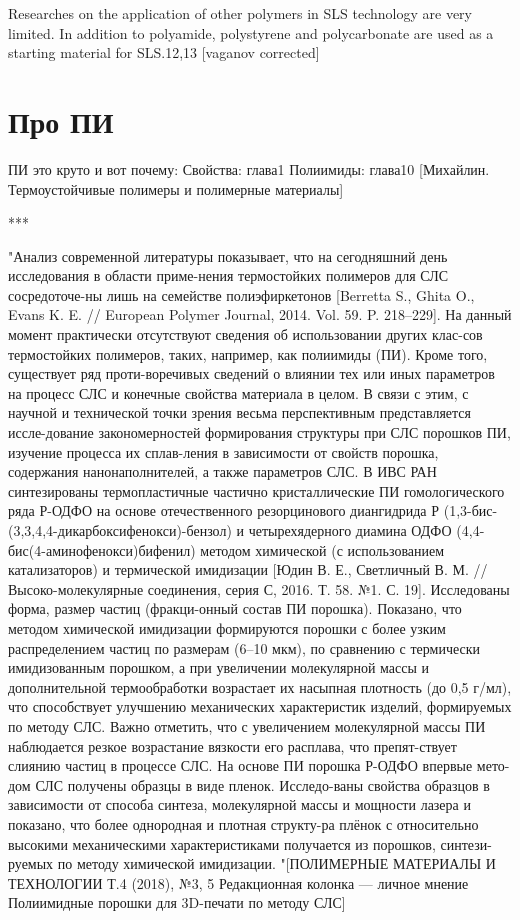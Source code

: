 \documentclass[oneside,final,14pt]{extreport}
\begin{document}
	Researches on the application of other polymers in SLS technology are very limited. In addition to polyamide, polystyrene and polycarbonate are used as a starting material for SLS.12,13
	[vaganov corrected]
	
	\section{Про ПИ}

	
	ПИ это круто и вот почему:
	Свойства: глава1
	Полиимиды: глава10
	[Михайлин. Термоустойчивые полимеры и полимерные материалы]
	
	
	
	***
	
	
	"Анализ современной литературы показывает, что на сегодняшний день исследования в области приме-нения термостойких полимеров для СЛС сосредоточе-ны лишь на семействе полиэфиркетонов [Berretta S., Ghita O., Evans K. E. // European Polymer Journal, 2014. Vol. 59. P. 218–229]. На данный момент практически отсутствуют сведения об использовании других клас-сов термостойких полимеров, таких, например, как полиимиды (ПИ). Кроме того, существует ряд проти-воречивых сведений о влиянии тех или иных параметров на процесс СЛС и конечные свойства материала в целом. В связи с этим, с научной и технической точки зрения весьма перспективным представляется иссле-дование закономерностей формирования структуры при СЛС порошков ПИ, изучение процесса их сплав-ления в зависимости от свойств порошка, содержания нанонаполнителей, а также параметров СЛС.
	В ИВС РАН синтезированы термопластичные частично кристаллические ПИ гомологического ряда Р-ОДФО на основе отечественного резорцинового диангидрида Р (1,3-бис-(3,3,4,4-дикарбоксифенокси)-бензол) и четырехядерного диамина ОДФО (4,4-бис(4-аминофенокси)бифенил) методом химической (с использованием катализаторов) и термической имидизации [Юдин В. Е., Светличный В. М. // Высоко-молекулярные соединения, серия С, 2016. Т. 58. №1. С. 19]. Исследованы форма, размер частиц (фракци-онный состав ПИ порошка). Показано, что методом химической имидизации формируются порошки с более узким распределением частиц по размерам (6–10 мкм), по сравнению с термически имидизованным порошком, а при увеличении молекулярной массы и дополнительной термообработки возрастает их насыпная плотность (до 0,5 г/мл), что способствует улучшению механических характеристик изделий, формируемых по методу СЛС. Важно отметить, что с увеличением молекулярной массы ПИ наблюдается резкое возрастание вязкости его расплава, что препят-ствует слиянию частиц в процессе СЛС.
На основе ПИ порошка Р-ОДФО впервые мето-дом СЛС получены образцы в виде пленок. Исследо-ваны свойства образцов в зависимости от способа синтеза, молекулярной массы и мощности лазера и показано, что более однородная и плотная структу-ра плёнок с относительно высокими механическими характеристиками получается из порошков, синтези-руемых по методу химической имидизации.
	"[ПОЛИМЕРНЫЕ МАТЕРИАЛЫ И ТЕХНОЛОГИИ Т.4 (2018), №3, 5
Редакционная колонка — личное мнение
Полиимидные порошки для 3D-печати по методу СЛС]
	
\end{document}
